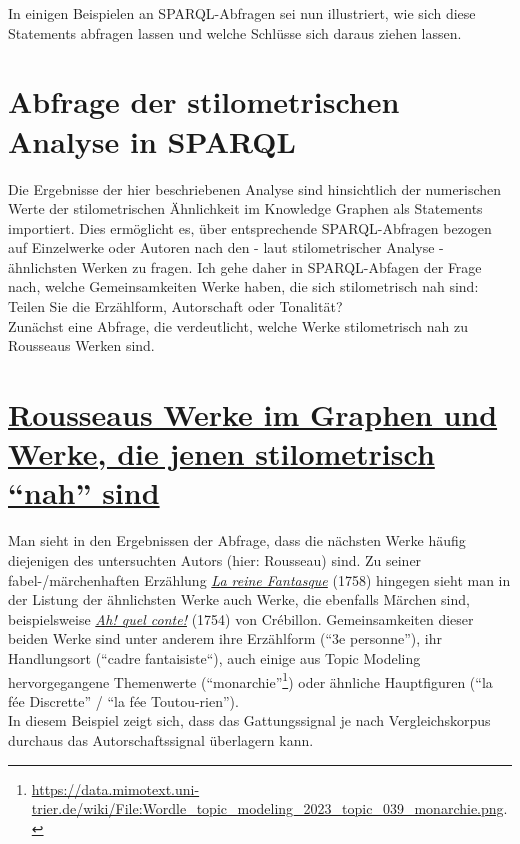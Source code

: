 \documentclass[
  12pt,
  letterpaper,
]{classicthesis}
\begin{document}
In einigen Beispielen an SPARQL-Abfragen sei nun illustriert, wie sich
diese Statements abfragen lassen und welche Schlüsse sich daraus ziehen
lassen.

\section{Abfrage der stilometrischen Analyse in
SPARQL}\label{abfrage-der-stilometrischen-analyse-in-sparql}

Die Ergebnisse der hier beschriebenen Analyse sind hinsichtlich der
numerischen Werte der stilometrischen Ähnlichkeit im Knowledge Graphen
als Statements importiert. Dies ermöglicht es, über entsprechende
SPARQL-Abfragen bezogen auf Einzelwerke oder Autoren nach den - laut
stilometrischer Analyse - ähnlichsten Werken zu fragen. Ich gehe daher
in SPARQL-Abfagen der Frage nach, welche Gemeinsamkeiten Werke haben,
die sich stilometrisch nah sind: Teilen Sie die Erzählform, Autorschaft
oder Tonalität?\\
Zunächst eine Abfrage, die verdeutlicht, welche Werke stilometrisch nah
zu Rousseaus Werken sind.

\section{\texorpdfstring{\href{http://tinyurl.com/ylafpk9d}{Rousseaus
Werke im Graphen und Werke, die jenen stilometrisch ``nah''
sind}}{Rousseaus Werke im Graphen und Werke, die jenen stilometrisch ``nah'' sind}}\label{rousseaus-werke-im-graphen-und-werke-die-jenen-stilometrisch-nah-sind}

Man sieht in den Ergebnissen der Abfrage, dass die nächsten Werke häufig
diejenigen des untersuchten Autors (hier: Rousseau) sind. Zu seiner
fabel-/märchenhaften Erzählung
\href{https://data.mimotext.uni-trier.de/wiki/Item:Q1379}{\emph{La reine
Fantasque}} (1758) hingegen sieht man in der Listung der ähnlichsten
Werke auch Werke, die ebenfalls Märchen sind, beispielsweise
\href{https://data.mimotext.uni-trier.de/wiki/Item:Q1013}{\emph{Ah! quel
conte!}} (1754) von Crébillon. Gemeinsamkeiten dieser beiden Werke sind
unter anderem ihre Erzählform (``3e personne''), ihr Handlungsort
(``cadre fantaisiste``), auch einige aus Topic Modeling hervorgegangene
Themenwerte (``monarchie''\footnote{\url{https://data.mimotext.uni-trier.de/wiki/File:Wordle_topic_modeling_2023_topic_039_monarchie.png}.})
oder ähnliche Hauptfiguren (``la fée Discrette'' / ``la fée
Toutou-rien'').\\
In diesem Beispiel zeigt sich, dass das Gattungssignal je nach
Vergleichskorpus durchaus das Autorschaftssignal überlagern kann.
\end{document}

